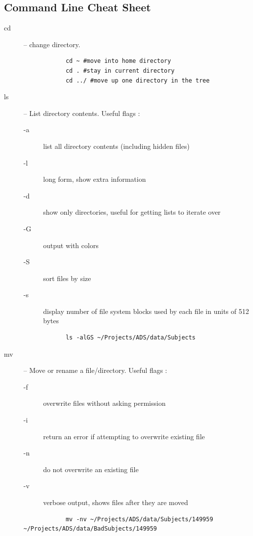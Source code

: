 \documentclass[paper=a4, fontsize=11pt]{scrartcl} %
\numberwithin{equation}{section} %
\numberwithin{figure}{section} %
\numberwithin{table}{section} %
\begin{document}
\newpage
\begin{appendices}

\section{Command Line Cheat Sheet}
\begin{description}
\item[cd] -- change directory.  
			\begin{lstlisting}
			cd ~ #move into home directory
			cd . #stay in current directory
			cd ../ #move up one directory in the tree
			\end{lstlisting}
\item[ls] -- List directory contents.  Useful flags :
			\begin{description}
			\item[-a] list all directory contents (including hidden files)
			\item[-l] long form, show extra information
			\item[-d] show only directories, useful for getting lists to iterate over
			\item[-G] output with colors
			\item[-S] sort files by size
			\item[-s] display number of file system blocks used by each file in units of 512 bytes
			\end{description}
			\begin{lstlisting}
			ls -alGS ~/Projects/ADS/data/Subjects
			\end{lstlisting}		
\item[mv] -- Move or rename a file/directory.  Useful flags :
			\begin{description}
			\item[-f] overwrite files without asking permission
			\item[-i] return an error if attempting to overwrite existing file
			\item[-n] do not overwrite an existing file 
			\item[-v] verbose output, shows files after they are moved
			\end{description}
			\begin{lstlisting}
			mv -nv ~/Projects/ADS/data/Subjects/149959 ~/Projects/ADS/data/BadSubjects/149959
			\end{lstlisting}					

\end{description}
\end{appendices}
\end{document}

